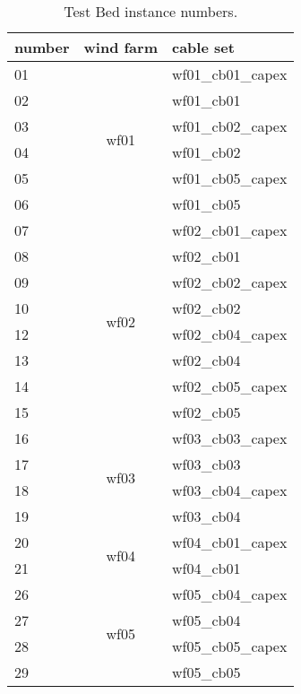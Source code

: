 \begin{table}[!htbp]\label{tab:testBed}
\center
\begin{tabular}{lcl}
\hline
number & \multicolumn{1}{l}{wind farm} & cable set         \\ \hline
01     & \multirow{6}{*}{wf01}         & wf01\_cb01\_capex \\
02     &                               & wf01\_cb01        \\
03     &                               & wf01\_cb02\_capex \\
04     &                               & wf01\_cb02        \\
05     &                               & wf01\_cb05\_capex \\
06     &                               & wf01\_cb05        \\ \hline
07     & \multirow{8}{*}{wf02}         & wf02\_cb01\_capex \\
08     &                               & wf02\_cb01        \\
09     &                               & wf02\_cb02\_capex \\
10     &                               & wf02\_cb02        \\
12     &                               & wf02\_cb04\_capex \\
13     &                               & wf02\_cb04        \\
14     &                               & wf02\_cb05\_capex \\
15     &                               & wf02\_cb05        \\ \hline
16     & \multirow{4}{*}{wf03}         & wf03\_cb03\_capex \\
17     &                               & wf03\_cb03        \\
18     &                               & wf03\_cb04\_capex \\
19     &                               & wf03\_cb04        \\ \hline
20     & \multirow{2}{*}{wf04}         & wf04\_cb01\_capex \\
21     &                               & wf04\_cb01        \\ \hline
26     & \multirow{4}{*}{wf05}         & wf05\_cb04\_capex \\
27     &                               & wf05\_cb04        \\
28     &                               & wf05\_cb05\_capex \\
29     &                               & wf05\_cb05        \\ \hline
\end{tabular}
\caption {Test Bed instance numbers.}
\end{table}